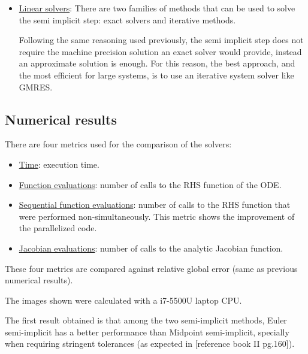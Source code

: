 \documentclass[12pt]{article}
\begin{document}
\begin{itemize}
    \item \underline{Linear solvers}: There are two families of methods that can be used to solve the semi implicit step: exact solvers and iterative methods.
    
    Following the same reasoning used previously, the semi implicit step does not require the machine precision solution an exact solver would provide, instead an approximate solution is enough. For this reason, the best approach, and the most efficient for large systems, is to use an iterative system solver like GMRES.

\end{itemize}


\subsection{Numerical results}

There are four metrics used for the comparison of the solvers:
\begin{itemize}

\item \underline{Time}: execution time.

\item \underline{Function evaluations}: number of calls to the RHS function of the ODE.

\item \underline{Sequential function evaluations}: number of calls to the RHS function that were performed non-simultaneously. This metric shows the improvement of the parallelized code. 

\item \underline{Jacobian evaluations}: number of calls to the analytic Jacobian function.

\end{itemize}

These four metrics are compared against relative global error (same as previous numerical results).

The images shown were calculated with a i7-5500U laptop CPU.

The first result obtained is that among the two semi-implicit methods, Euler semi-implicit has a better performance than Midpoint semi-implicit, specially when requiring stringent tolerances (as expected in [reference book II pg.160]).
\end{document}
